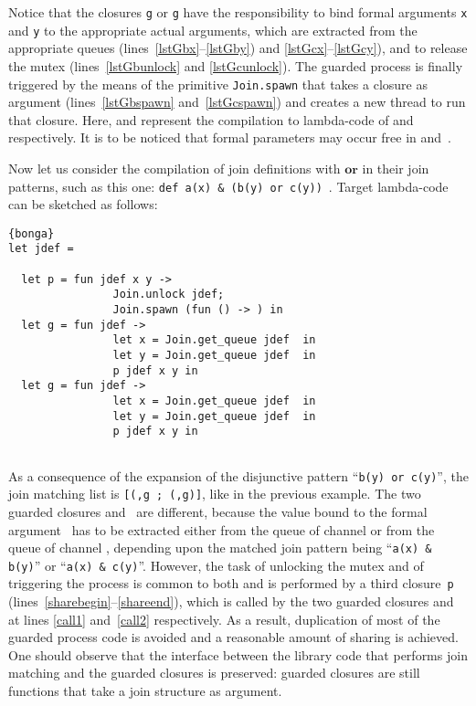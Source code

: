 \documentclass{LMCS}
\let \lst \lstinline
\newcommand{\kwd}[1]{\ensuremath{\mathbf{#1}}}
\renewcommand{\_}{\mathord{\rule[-.25ex]{1ex}{.15ex}}}
\begin{document}
Notice that the closures \lst|g| or \lst|g|
have the responsibility to bind formal arguments \lst|x| and \lst|y|
to the
appropriate actual arguments, which are extracted from the appropriate
queues (lines~\ref{lstGbx}--\ref{lstGby}) and
\ref{lstGcx}--\ref{lstGcy}), and to release the mutex
(lines~\ref{lstGbunlock} and \ref{lstGcunlock}).
The guarded process is finally triggered by the means of
the primitive \lst|Join.spawn| that takes a closure as argument
(lines~\ref{lstGbspawn} and~\ref{lstGcspawn}) and creates a new thread
to run that closure.
Here,   and  represent the
compilation to lambda-code of  and~ respectively.
It is to be noticed that formal parameters may occur free in
 and~.

Now let us consider the compilation of join definitions with \kwd{or}
in their join patterns, such as this one:
\lst|def a(x) & (b(y) or c(y))|~.
Target lambda-code  can be sketched as follows:
\begin{lstlisting}[indent=1.8em,labelstep=1]{bonga}
let jdef = 
   
  let p = fun jdef x y ->
                Join.unlock jdef;
                Join.spawn (fun () -> ) in 
  let g = fun jdef ->
                let x = Join.get_queue jdef  in
                let y = Join.get_queue jdef  in
                p jdef x y in 
  let g = fun jdef ->
                let x = Join.get_queue jdef  in
                let y = Join.get_queue jdef  in
                p jdef x y in 
   
\end{lstlisting}
As a consequence of the expansion of the disjunctive pattern
``\lst"b(y) or c(y)"'', the join matching list is
\lst|[(,g ; (,g)]|, like in the
previous example. The two guarded closures 
and~ are different, because the value bound to the
formal argument~ has to be extracted either from the queue of
channel  or from the queue of channel , depending upon
the matched join pattern being ``\lst!a(x) & b(y)!'' or ``\lst!a(x) & c(y)!''.
However, the task of unlocking the mutex and of triggering
the process  is common to both and is performed by a third
closure~\lst|p| (lines~\ref{sharebegin}--\ref{shareend}), which is
called by the two guarded closures  and~
 at lines \ref{call1} and~\ref{call2} respectively.
As a result, duplication of most of the guarded process code is
avoided and a reasonable amount of sharing is achieved.  One should
observe that the interface between the library code that performs join
matching and the guarded closures is preserved: guarded closures are
still functions that take a join structure as argument.
\end{document}
